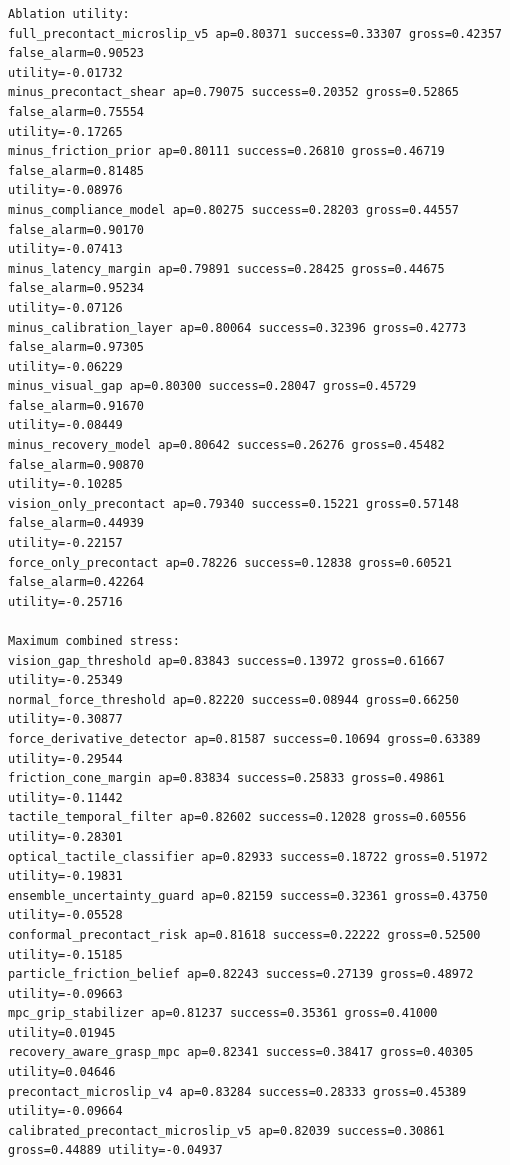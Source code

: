 \documentclass{article}
\begin{document}
\begin{tiny}
\begin{verbatim}
Ablation utility:
full_precontact_microslip_v5 ap=0.80371 success=0.33307 gross=0.42357 false_alarm=0.90523
utility=-0.01732
minus_precontact_shear ap=0.79075 success=0.20352 gross=0.52865 false_alarm=0.75554
utility=-0.17265
minus_friction_prior ap=0.80111 success=0.26810 gross=0.46719 false_alarm=0.81485
utility=-0.08976
minus_compliance_model ap=0.80275 success=0.28203 gross=0.44557 false_alarm=0.90170
utility=-0.07413
minus_latency_margin ap=0.79891 success=0.28425 gross=0.44675 false_alarm=0.95234
utility=-0.07126
minus_calibration_layer ap=0.80064 success=0.32396 gross=0.42773 false_alarm=0.97305
utility=-0.06229
minus_visual_gap ap=0.80300 success=0.28047 gross=0.45729 false_alarm=0.91670
utility=-0.08449
minus_recovery_model ap=0.80642 success=0.26276 gross=0.45482 false_alarm=0.90870
utility=-0.10285
vision_only_precontact ap=0.79340 success=0.15221 gross=0.57148 false_alarm=0.44939
utility=-0.22157
force_only_precontact ap=0.78226 success=0.12838 gross=0.60521 false_alarm=0.42264
utility=-0.25716

Maximum combined stress:
vision_gap_threshold ap=0.83843 success=0.13972 gross=0.61667 utility=-0.25349
normal_force_threshold ap=0.82220 success=0.08944 gross=0.66250 utility=-0.30877
force_derivative_detector ap=0.81587 success=0.10694 gross=0.63389 utility=-0.29544
friction_cone_margin ap=0.83834 success=0.25833 gross=0.49861 utility=-0.11442
tactile_temporal_filter ap=0.82602 success=0.12028 gross=0.60556 utility=-0.28301
optical_tactile_classifier ap=0.82933 success=0.18722 gross=0.51972 utility=-0.19831
ensemble_uncertainty_guard ap=0.82159 success=0.32361 gross=0.43750 utility=-0.05528
conformal_precontact_risk ap=0.81618 success=0.22222 gross=0.52500 utility=-0.15185
particle_friction_belief ap=0.82243 success=0.27139 gross=0.48972 utility=-0.09663
mpc_grip_stabilizer ap=0.81237 success=0.35361 gross=0.41000 utility=0.01945
recovery_aware_grasp_mpc ap=0.82341 success=0.38417 gross=0.40305 utility=0.04646
precontact_microslip_v4 ap=0.83284 success=0.28333 gross=0.45389 utility=-0.09664
calibrated_precontact_microslip_v5 ap=0.82039 success=0.30861 gross=0.44889 utility=-0.04937


\end{verbatim}
\end{tiny}
\end{document}
